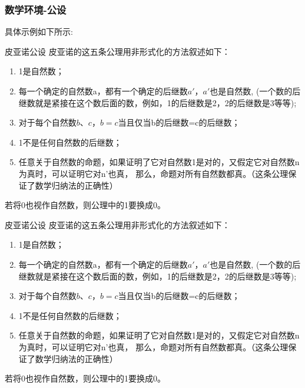 \subsubsection{数学环境-公设}
具体示例如下所示:
\begin{postulate}{皮亚诺公设}
    皮亚诺的这五条公理用非形式化的方法叙述如下：
    \begin{enumerate}
        \item 1是自然数；
        \item 每一个确定的自然数a，都有一个确定的后继数$a'$，$a'$也是自然数, 
        (一个数的后继数就是紧接在这个数后面的数，例如，1的后继数是2，2的后继数是3等等);
        \item 对于每个自然数$b、c，b=c$当且仅当b的后继数=c的后继数；
        \item 1不是任何自然数的后继数；
        \item 任意关于自然数的命题，如果证明了它对自然数1是对的，又假定它对自然数n为真时，可以证明它对n'也真， 
        那么，命题对所有自然数都真。（这条公理保证了数学归纳法的正确性）
    \end{enumerate}
    若将0也视作自然数，则公理中的1要换成0。
\end{postulate}
\begin{tcblisting}{}
\begin{postulate}{皮亚诺公设}
皮亚诺的这五条公理用非形式化的方法叙述如下：
\begin{enumerate}
\item 1是自然数；
\item 每一个确定的自然数a，都有一个确定的后继数$a'$，$a'$也是自然数, 
(一个数的后继数就是紧接在这个数后面的数，例如，1的后继数是2，2的后继数是3等等);
\item 对于每个自然数$b、c，b=c$当且仅当b的后继数=c的后继数；
\item 1不是任何自然数的后继数；
\item 任意关于自然数的命题，如果证明了它对自然数1是对的，又假定它对自然数n为真时，可以证明它对n'也真， 
那么，命题对所有自然数都真。（这条公理保证了数学归纳法的正确性）
\end{enumerate}
若将0也视作自然数，则公理中的1要换成0。
\end{postulate}
\end{tcblisting}

